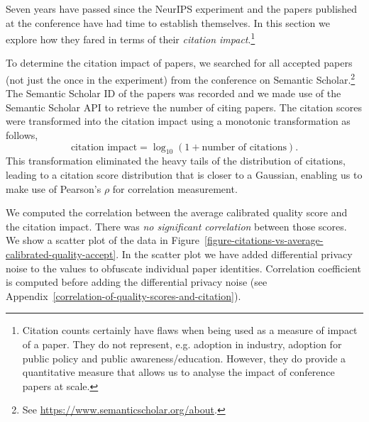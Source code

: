 \documentclass[twoside]{article}
\begin{document}
Seven years have passed since the NeurIPS experiment and the papers
published at the conference have had time to establish themselves. In
this section we explore how they fared in terms of their
\emph{citation impact}.\footnote{Citation counts certainly have flaws
  when being used as a measure of impact of a paper. They do not
  represent, e.g. adoption in industry, adoption for public policy and
  public awareness/education. However, they do provide a quantitative
  measure that allows us to analyse the impact of conference papers at
  scale.}

To determine the citation impact of papers, we searched for all
accepted papers (not just the once in the experiment) from the conference on Semantic Scholar.\footnote{See
  \url{https://www.semanticscholar.org/about}.}
The Semantic Scholar ID of the papers was recorded and we made use of
the Semantic Scholar API to retrieve the number of citing papers. The
citation scores were transformed into the citation impact using a
monotonic transformation as follows,
$$
\text{citation impact} = \log_{10} (1 + \text{number of citations}).
$$
This transformation eliminated the heavy tails of the distribution
of citations, leading to a citation score distribution that is closer
to a Gaussian, enabling us to make use of Pearson's $\rho$ for
correlation measurement.

We computed the correlation between the average calibrated quality
score and the citation impact. There was \emph{no significant
  correlation} between those scores. We show a scatter plot of the
data in Figure~\ref{figure-citations-vs-average-calibrated-quality-accept}. In the
scatter plot we have added differential privacy noise to the values
 to obfuscate individual paper
identities. Correlation coefficient is computed before adding the
differential privacy noise (see Appendix~\ref{correlation-of-quality-scores-and-citation}).
\end{document}
